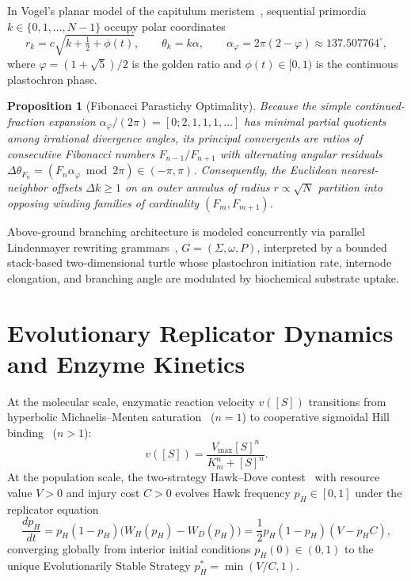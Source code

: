 \documentclass[12pt]{article}
\newtheorem{proposition}{Proposition}
\begin{document}
In Vogel's planar model of the capitulum meristem~\cite{vogel1979better}, sequential primordia $k \in \{0, 1, \dots, N-1\}$ occupy polar coordinates
\begin{equation}
r_k = c \sqrt{k + \tfrac{1}{2} + \phi(t)}, \qquad \theta_k = k \alpha, \qquad \alpha_\varphi = 2\pi(2 - \varphi) \approx 137.507764^\circ,
\end{equation}
where $\varphi = (1 + \sqrt{5}) / 2$ is the golden ratio and $\phi(t) \in [0, 1)$ is the continuous plastochron phase.

\begin{proposition}[Fibonacci Parastichy Optimality]
Because the simple continued-fraction expansion $\alpha_\varphi / (2\pi) = [0; 2, 1, 1, 1, \dots]$ has minimal partial quotients among irrational divergence angles, its principal convergents are ratios of consecutive Fibonacci numbers $F_{n-1} / F_{n+1}$ with alternating angular residuals $\Delta \theta_{F_n} = (F_n \alpha_\varphi \bmod 2\pi) \in (-\pi, \pi)$. Consequently, the Euclidean nearest-neighbor offsets $\Delta k \ge 1$ on an outer annulus of radius $r \propto \sqrt{N}$ partition into opposing winding families of cardinality $(F_m, F_{m+1})$.
\end{proposition}

Above-ground branching architecture is modeled concurrently via parallel Lindenmayer rewriting grammars~\cite{lindenmayer1968mathematical}, $G = (\Sigma, \omega, P)$, interpreted by a bounded stack-based two-dimensional turtle whose plastochron initiation rate, internode elongation, and branching angle are modulated by biochemical substrate uptake.

\section{Evolutionary Replicator Dynamics and Enzyme Kinetics}

At the molecular scale, enzymatic reaction velocity $v([S])$ transitions from hyperbolic Michaelis--Menten saturation~\cite{michaelis1913kinetik} ($n = 1$) to cooperative sigmoidal Hill binding~\cite{hill1910possible} ($n > 1$):
\begin{equation}
v([S]) = \frac{V_{\max} [S]^n}{K_m^n + [S]^n}.
\end{equation}
At the population scale, the two-strategy Hawk--Dove contest~\cite{maynardsmith1973logic} with resource value $V > 0$ and injury cost $C > 0$ evolves Hawk frequency $p_H \in [0, 1]$ under the replicator equation
\begin{equation}
\frac{dp_H}{dt} = p_H(1 - p_H)\bigl(W_H(p_H) - W_D(p_H)\bigr) = \frac{1}{2} p_H(1 - p_H)(V - p_H C),
\end{equation}
converging globally from interior initial conditions $p_H(0) \in (0, 1)$ to the unique Evolutionarily Stable Strategy $p_H^* = \min(V / C, 1)$.



\end{document}
